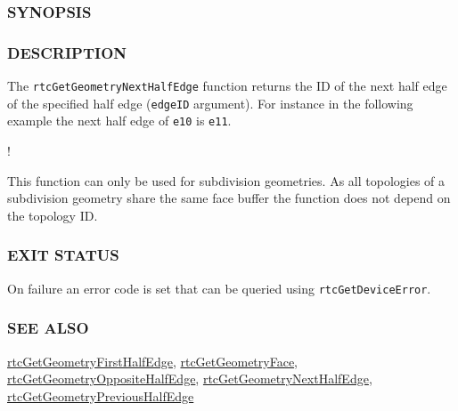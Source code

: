 \subsubsection{SYNOPSIS}\label{synopsis}

\begin{Shaded}
\begin{Highlighting}[]

 \OperatorTok{(}
\OperatorTok{,}
   
\OperatorTok{);}
\end{Highlighting}
\end{Shaded}

\subsubsection{DESCRIPTION}\label{description}

The \texttt{rtcGetGeometryNextHalfEdge} function returns the ID of the
next half edge of the specified half edge (\texttt{edgeID} argument).
For instance in the following example the next half edge of \texttt{e10}
is \texttt{e11}.

!\href{images/half_edges.pdf}{}

This function can only be used for subdivision geometries. As all
topologies of a subdivision geometry share the same face buffer the
function does not depend on the topology ID.

\subsubsection{EXIT STATUS}\label{exit-status}

On failure an error code is set that can be queried using
\texttt{rtcGetDeviceError}.

\subsubsection{SEE ALSO}\label{see-also}

\hyperref[rtcgetgeometryfirsthalfedge]{rtcGetGeometryFirstHalfEdge},
\hyperref[rtcgetgeometryface]{rtcGetGeometryFace},
\hyperref[rtcgetgeometryoppositehalfedge]{rtcGetGeometryOppositeHalfEdge},
\hyperref[rtcgetgeometrynexthalfedge]{rtcGetGeometryNextHalfEdge},
\hyperref[rtcgetgeometryprevioushalfedge]{rtcGetGeometryPreviousHalfEdge}

